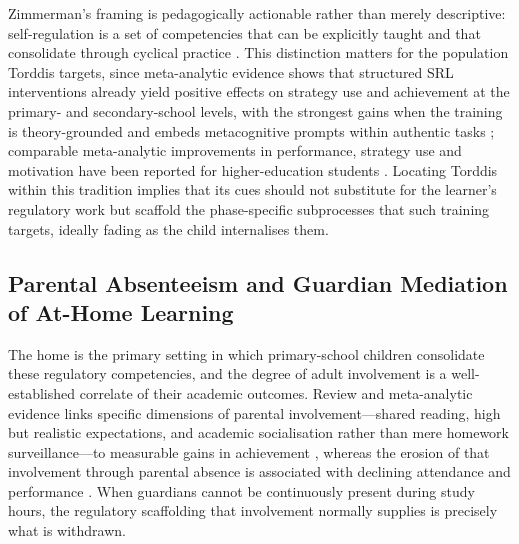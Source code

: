 Zimmerman's framing is pedagogically actionable rather than merely descriptive: self-regulation is a set of competencies that can be explicitly taught and that consolidate through cyclical practice \citep{Zimmerman2002Becoming}. This distinction matters for the population Torddis targets, since meta-analytic evidence shows that structured SRL interventions already yield positive effects on strategy use and achievement at the primary- and secondary-school levels, with the strongest gains when the training is theory-grounded and embeds metacognitive prompts within authentic tasks \citep{Dignath2008Components}; comparable meta-analytic improvements in performance, strategy use and motivation have been reported for higher-education students \citep{Theobald2021Self}. Locating Torddis within this tradition implies that its cues should not substitute for the learner's regulatory work but scaffold the phase-specific subprocesses that such training targets, ideally fading as the child internalises them.

\subsection{Parental Absenteeism and Guardian Mediation of At-Home Learning}
\label{sec:guardian-mediation}
The home is the primary setting in which primary-school children consolidate these regulatory competencies, and the degree of adult involvement is a well-established correlate of their academic outcomes. Review and meta-analytic evidence links specific dimensions of parental involvement---shared reading, high but realistic expectations, and academic socialisation rather than mere homework surveillance---to measurable gains in achievement \citep{Boonk2018Review, Hill2009Parental}, whereas the erosion of that involvement through parental absence is associated with declining attendance and performance \citep{Seidu2022Truancy}. When guardians cannot be continuously present during study hours, the regulatory scaffolding that involvement normally supplies is precisely what is withdrawn.

